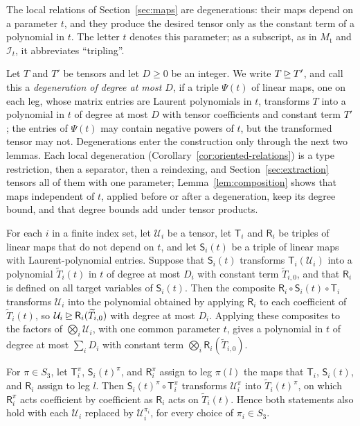 The local relations of Section~\ref{sec:maps} are degenerations: their maps
depend on a parameter \(t\), and they produce the desired tensor only as the
constant term of a polynomial in \(t\). The letter \(t\) denotes this
parameter; as a subscript, as in \(M_{\mathrm t}\) and \(\mathcal I_t\), it
abbreviates ``tripling''.

Let \(T\) and \(T'\) be tensors and let \(D\ge0\) be an integer. We write
\(T\unrhd T'\), and call this a \emph{degeneration of degree at most
\(D\)}, if a triple \(\Psi(t)\) of linear maps, one on each leg, whose
matrix entries are Laurent polynomials in \(t\), transforms \(T\) into a
polynomial in \(t\) of degree at most \(D\) with tensor coefficients and
constant term \(T'\); the entries of \(\Psi(t)\) may contain negative
powers of \(t\), but the transformed tensor may not. Degenerations enter the
construction only through the next two lemmas. Each local degeneration
(Corollary~\ref{cor:oriented-relations}) is a type restriction, then a
separator, then a reindexing, and Section~\ref{sec:extraction} tensors all
of them with one parameter; Lemma~\ref{lem:composition} shows that maps independent of
\(t\), applied before or after a degeneration, keep its degree bound, and
that degree bounds add under tensor products.

\begin{lemma}[Composition]\label{lem:composition}
For each \(i\) in a finite index set, let \(\mathcal U_i\) be a tensor, let
\(\mathsf T_i\) and \(\mathsf R_i\) be triples of linear maps that do not
depend on \(t\), and let \(\mathsf S_i(t)\) be a triple of linear maps with
Laurent-polynomial entries. Suppose that \(\mathsf S_i(t)\) transforms
\(\mathsf T_i(\mathcal U_i)\) into a polynomial \(\widetilde T_i(t)\) in
\(t\) of degree at most \(D_i\) with constant term \(\widetilde T_{i,0}\),
and that \(\mathsf R_i\) is defined on all target variables of
\(\mathsf S_i(t)\). Then the composite
\(\mathsf R_i\circ\mathsf S_i(t)\circ\mathsf T_i\) transforms
\(\mathcal U_i\) into the polynomial obtained by applying \(\mathsf R_i\) to
each coefficient of \(\widetilde T_i(t)\), so
\(\mathcal U_i\unrhd\mathsf R_i(\widetilde T_{i,0})\) with degree at most
\(D_i\). Applying these composites to the factors of
\(\bigotimes_i\mathcal U_i\), with one common parameter \(t\), gives a
polynomial in \(t\) of degree at most \(\sum_iD_i\) with constant term
\(\bigotimes_i\mathsf R_i(\widetilde T_{i,0})\).

For \(\pi\in S_3\), let \(\mathsf T_i^\pi\), \(\mathsf S_i(t)^\pi\), and
\(\mathsf R_i^\pi\) assign to leg \(\pi(l)\) the maps that \(\mathsf T_i\),
\(\mathsf S_i(t)\), and \(\mathsf R_i\) assign to leg \(l\). Then
\(\mathsf S_i(t)^\pi\circ\mathsf T_i^\pi\) transforms
\(\mathcal U_i^\pi\) into \(\widetilde T_i(t)^\pi\), on which
\(\mathsf R_i^\pi\) acts coefficient by coefficient as \(\mathsf R_i\)
acts on \(\widetilde T_i(t)\). Hence both statements also hold with each
\(\mathcal U_i\) replaced by \(\mathcal U_i^{\pi_i}\), for every choice of
\(\pi_i\in S_3\).
\end{lemma}

